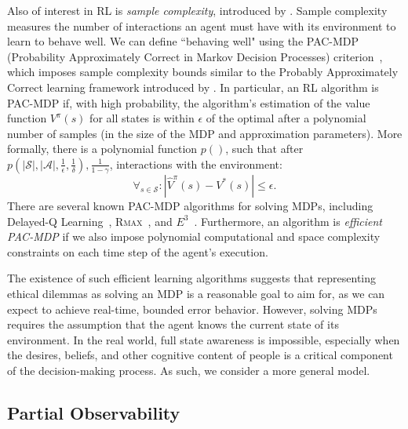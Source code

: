 \documentclass[11pt]{article}
\newcommand\jmnote[1]{\textcolor{red}{James: #1}}
\begin{document}
Also of interest in RL is \emph{sample complexity}, introduced by \cite{kakade2003sample}. Sample complexity measures the number of interactions an agent must have with its environment to learn to behave well. We can define ``behaving well" using the PAC-MDP (Probability Approximately Correct in Markov Decision Processes) criterion~\cite{strehl2009reinforcement}, which imposes sample complexity bounds similar to the Probably Approximately Correct learning framework introduced by \cite{valiant1984theory}. In particular, an RL algorithm is PAC-MDP if, with high probability, the algorithm's estimation of the value function $V^\pi(s)$ for all states is within $\epsilon$ of the optimal after a polynomial number of samples (in the size of the MDP and approximation parameters). More formally, there is a polynomial function $p()$, such that after $p(|\mathcal{S}|, |\mathcal{A}|, \frac{1}{\epsilon}, \frac{1}{\delta}), \frac{1}{1-\gamma}$, interactions with the environment:
\begin{equation}
\forall_{s \in \mathcal{S}} : |\hat{V}^\pi(s) - V^*(s)| \leq \epsilon.
\end{equation}
There are several known PAC-MDP algorithms for solving MDPs, including Delayed-Q Learning~\cite{strehl2006pac}, \textsc{Rmax}~\cite{brafman2003r}, and $E^3$~\cite{kearns2002near}. Furthermore, an algorithm is {\it efficient PAC-MDP} if we also impose polynomial computational and space complexity constraints on each time step of the agent's execution.

The existence of such efficient learning algorithms suggests that representing ethical dilemmas as solving an MDP is a reasonable goal to aim for, as we can expect to achieve real-time, bounded error behavior. However, solving MDPs requires the assumption that the agent knows the current state of its environment. In the real world, full state awareness is impossible, especially when the desires, beliefs, and other cognitive content of people is a critical component of the decision-making process. As such, we consider a more general model.

\subsection{Partial Observability}
\end{document}
